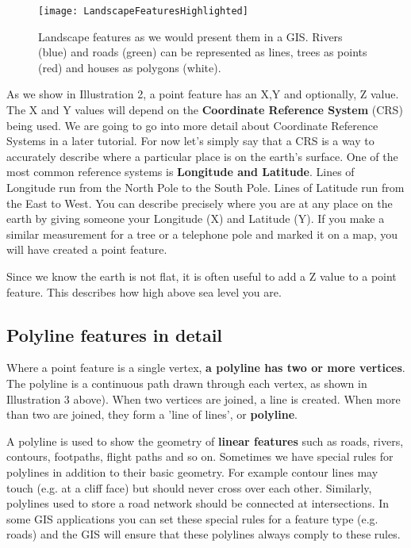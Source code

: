 \begin{figure}[ht]
   \begin{center}
   \caption{Landscape features as we would present them in a GIS. Rivers
(blue) and roads (green) can be represented as lines, trees as points (red)
and houses as polygons (white).}
\label{fig:landscapefeatures}\smallskip
   \texttt{[image: LandscapeFeaturesHighlighted]}
\end{center}
\end{figure}

As we show in Illustration 2, a point feature has an X,Y and optionally, Z
value. The X and Y values will depend on the \textbf{Coordinate Reference
System} (CRS) being used. We are going to go into more detail about Coordinate
Reference Systems in a later tutorial. For now let's simply say that a CRS is
a way to accurately describe where a particular place is on the earth's
surface. One of the most common reference systems is \textbf{Longitude and
Latitude}.
Lines of Longitude run from the North Pole to the South Pole. Lines of
Latitude run from the East to West. You can describe precisely where you are
at any place on the earth by giving someone your Longitude (X) and Latitude
(Y). If you make a similar measurement for a tree or a telephone pole and
marked it on a map, you will have created a point feature. 

Since we know the earth is not flat, it is often useful to add a Z value to a
point feature. This describes how high above sea level you are. 

\subsection{Polyline features in detail}\label{subsec:linefeatures}

Where a point feature is a single vertex, \textbf{a polyline has two or more
vertices}. The polyline is a continuous path drawn through each vertex, as
shown in Illustration 3 above). When two vertices are joined, a line is
created. When more than two are joined, they form a 'line of lines', or
\textbf{polyline}.

A polyline is used to show the geometry of \textbf{linear features} such as
roads, rivers, contours, footpaths, flight paths and so on. Sometimes we have
special rules for polylines in addition to their basic geometry. For example
contour lines may touch (e.g. at a cliff face) but should never cross over
each other. Similarly, polylines used to store a road network should be
connected at intersections. In some GIS applications you can set these
special rules for a feature type (e.g. roads) and the GIS will ensure that
these polylines always comply to these rules.

